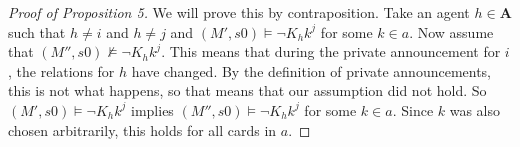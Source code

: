 \documentclass[a4paper, 10pt]{article}
\newcommand{\A}{\mathbf{A}}
\begin{document}
\begin{proof}[Proof of Proposition 5]
    We will prove this by contraposition.
    Take an agent $h \in \A$ such that $h \not = i$ and $h \not = j$ and
    $(M', s0) \models \neg K_h k^j$ for some $k \in a$. Now assume that
    $(M'', s0) \not \models \neg K_h k^j$. This means that during the private
    announcement for $i$, the relations for $h$ have changed. By
    the definition of private announcements, this is not what happens, so
    that means that our assumption did not hold. So $(M', s0) \models \neg
    K_h k^j$ implies $(M'', s0) \models \neg K_h k^j$ for some $k \in a$.
    Since $k$ was also chosen arbitrarily, this holds for all cards in $a$. 
\end{proof}



\end{document}
